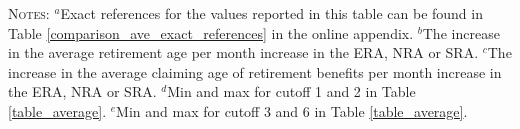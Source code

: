 \documentclass[12pt,a4paper]{article}
\begin{document}
\begin{table}[h]
\begin{adjustwidth}{-0.25in}{-0.25in}
\begin{tabular}{lclc ccc}
		\bottomrule		
	\end{tabular}
\begin{minipage}{18cm}%
	\textsc{Notes:} $^a$Exact references for the values reported in this table can be found in Table \ref{comparison_ave_exact_references} in the online appendix. $^b$The increase in the average retirement age per month increase in the ERA, NRA or SRA. $^c$The increase in the average claiming age of retirement benefits per month increase in the ERA, NRA or SRA. $^d$Min and max for cutoff 1 and 2 in Table \ref{table_average}. $^e$Min and max for cutoff 3 and 6 in Table \ref{table_average}.
\end{minipage}%
\vspace{-2cm}
\end{adjustwidth}
\end{table}
\end{document}
